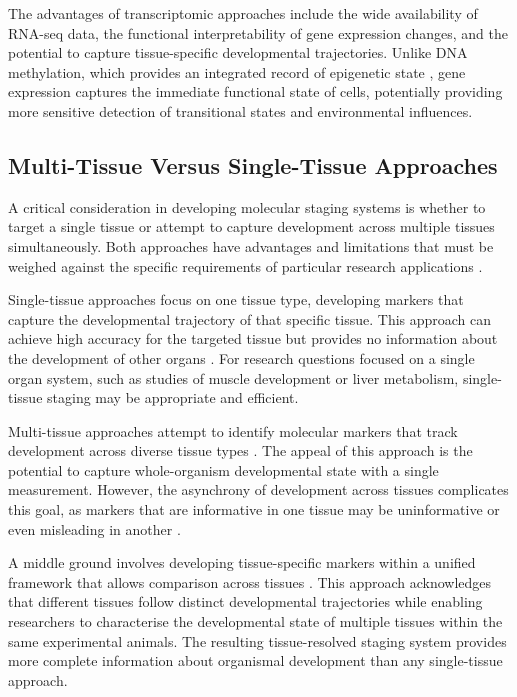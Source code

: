 The advantages of transcriptomic approaches include the wide availability of RNA-seq data, the functional interpretability of gene expression changes, and the potential to capture tissue-specific developmental trajectories. Unlike DNA methylation, which provides an integrated record of epigenetic state \parencite{teschendorff_epigenetic_2025}, gene expression captures the immediate functional state of cells, potentially providing more sensitive detection of transitional states and environmental influences.

\subsection{Multi-Tissue Versus Single-Tissue Approaches}

A critical consideration in developing molecular staging systems is whether to target a single tissue or attempt to capture development across multiple tissues simultaneously. Both approaches have advantages and limitations that must be weighed against the specific requirements of particular research applications \parencite{duan_epigenetic_2022}.

Single-tissue approaches focus on one tissue type, developing markers that capture the developmental trajectory of that specific tissue. This approach can achieve high accuracy for the targeted tissue but provides no information about the development of other organs \parencite{hannum_genome-wide_2013}. For research questions focused on a single organ system, such as studies of muscle development or liver metabolism, single-tissue staging may be appropriate and efficient.

Multi-tissue approaches attempt to identify molecular markers that track development across diverse tissue types \parencite{horvath_dna_2013}. The appeal of this approach is the potential to capture whole-organism developmental state with a single measurement. However, the asynchrony of development across tissues complicates this goal, as markers that are informative in one tissue may be uninformative or even misleading in another \parencite{meer_whole_2018}.

A middle ground involves developing tissue-specific markers within a unified framework that allows comparison across tissues \parencite{bi_ageing_clock_team_multi-tissue_2017}. This approach acknowledges that different tissues follow distinct developmental trajectories while enabling researchers to characterise the developmental state of multiple tissues within the same experimental animals. The resulting tissue-resolved staging system provides more complete information about organismal development than any single-tissue approach.

